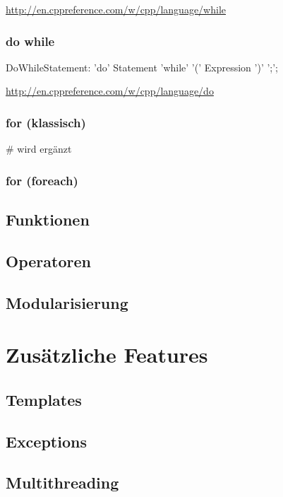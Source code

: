 \documentclass[a4paper]{report}
\begin{document}
\url{http://en.cppreference.com/w/cpp/language/while}
\subsection{do while}

\begin{rail}
	DoWhileStatement: 'do' Statement 'while' '(' Expression ')' ';';
\end{rail}
\url{http://en.cppreference.com/w/cpp/language/do}

\subsection{for (klassisch)}
\# wird ergänzt

\subsection{for (foreach)}


\section{Funktionen}
\section{Operatoren}




\section{Modularisierung}

\chapter{Zusätzliche Features}
\section{Templates}
\section{Exceptions}
\section{Multithreading}
\end{document}
